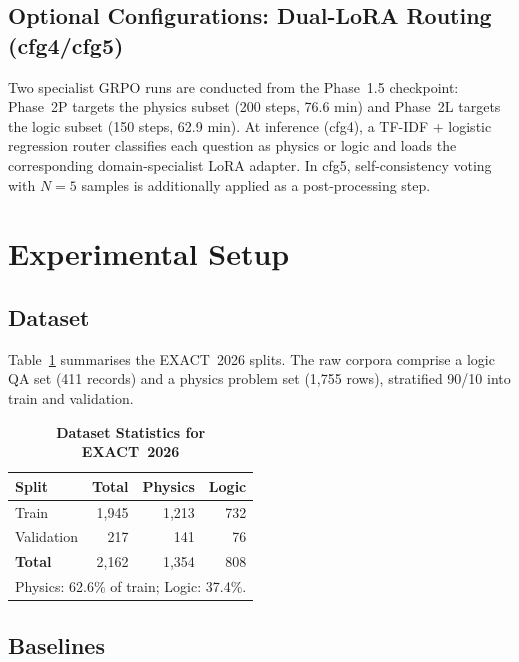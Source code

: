 \documentclass{ieeeaccess}
\newcommand{\dataset}{EXACT~2026}
\begin{document}
\subsection{Optional Configurations: Dual-LoRA Routing (cfg4/cfg5)}

Two specialist GRPO runs are conducted from the Phase~1.5 checkpoint:
Phase~2P targets the physics subset (200 steps, 76.6 min) and Phase~2L
targets the logic subset (150 steps, 62.9 min).
At inference (cfg4), a TF-IDF + logistic regression router classifies
each question as physics or logic and loads the corresponding
domain-specialist LoRA adapter.
In cfg5, self-consistency voting with $N=5$ samples is additionally
applied as a post-processing step.

\section{Experimental Setup}
\label{sec:setup}

\subsection{Dataset}

Table~\ref{tab:dataset} summarises the \dataset{} splits.
The raw corpora comprise a logic QA set (411 records) and a physics
problem set (1,755 rows), stratified 90/10 into train and validation.

\begin{table}[t]
\caption{\textbf{Dataset Statistics for \dataset{}}}
\label{tab:dataset}
\centering
\setlength{\tabcolsep}{6pt}
\begin{tabular}{lrrr}
\toprule
\textbf{Split} & \textbf{Total} & \textbf{Physics} & \textbf{Logic} \\
\midrule
Train         & 1,945 & 1,213 & 732 \\
Validation    &   217 &   141 &  76 \\
\midrule
\textbf{Total}&  2,162 & 1,354 & 808 \\
\bottomrule
\multicolumn{4}{l}{\footnotesize Physics: 62.6\% of train; Logic: 37.4\%.}
\end{tabular}
\end{table}

\subsection{Baselines}
\end{document}
